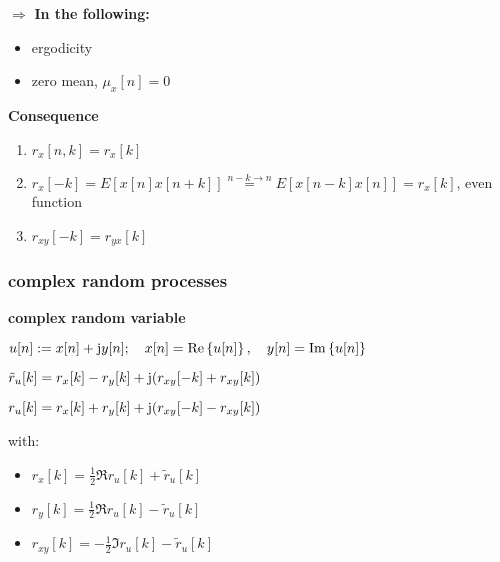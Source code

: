 $\Rightarrow$ \textbf{In the following:} 
\begin{itemize}
\item ergodicity
\item zero mean, $\mu_x[n]=0$
\end{itemize} 

\textbf{Consequence}
\begin{enumerate}
\item $r_x[n,k]=r_x[k]$
\item $r_x[-k]=E[x[n]x[n+k]]\overset{n-k\to n}{=}E[x[n-k]x[n]]=r_x[k]$, \quad even function
\item $r_{xy}[-k]=r_{yx}[k]$
\end{enumerate}


\subsubsection{complex random processes}
\textbf{complex random variable}

\quad$u[n]:=x[n]+\mathrm{j} y[n]; \quad x[n]=\operatorname{Re}\left\{u[n]\right\}, \quad y[n]=\operatorname{Im}\left\{u[n]\right\}$


\quad $\tilde{r}_u[k]=r_x[k]-r_y[k]+\mathrm{j} (r_{xy}[-k]+r_{xy}[k])$

\quad ${r}_u[k]=r_x[k]+r_y[k]+\mathrm{j} (r_{xy}[-k]-r_{xy}[k])$

\quad with: 
\begin{itemize}
\item $r_x[k]=\frac{1}{2}\Re{r_u[k]+\tilde{r}_u[k]}$
\item $r_y[k]=\frac{1}{2}\Re{r_u[k]-\tilde{r}_u[k]}$
\item $r_{xy}[k]=-\frac{1}{2}\Im{r_u[k]-\tilde{r}_u[k]}$
\end{itemize}


